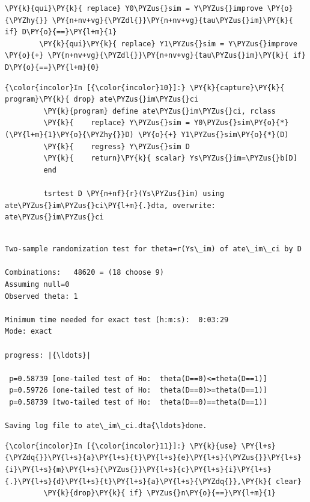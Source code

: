\documentclass[11pt,notitlepage]{article}\usepackage[]{graphicx}\usepackage[]{color}
\makeatletter
\newenvironment{kframe}{%
 \def\at@end@of@kframe{}%
 \ifinner\ifhmode%
  \def\at@end@of@kframe{\end{minipage}}%
  \begin{minipage}{\columnwidth}%
 \fi\fi%
 \def\FrameCommand##1{\hskip\@totalleftmargin \hskip-\fboxsep
 \colorbox{shadecolor}{##1}\hskip-\fboxsep
     \hskip-\linewidth \hskip-\@totalleftmargin \hskip\columnwidth}%
 \MakeFramed {\advance\hsize-\width
   \@totalleftmargin\z@ \linewidth\hsize
   \@setminipage}}%
 {\par\unskip\endMakeFramed%
 \at@end@of@kframe}
\newenvironment{knitrout}{}{} %
\makeatother
\begin{document}
\begin{enumerate}[a)]
\begin{knitrout}
\begin{kframe}
\begin{Verbatim}[commandchars=\\\{\}]
        \PY{k}{qui}\PY{k}{ replace} Y0\PYZus{}sim = Y\PYZus{}improve \PY{o}{\PYZhy{}} \PY{n+nv+vg}{\PYZdl{}}\PY{n+nv+vg}{tau\PYZus{}im}\PY{k}{ if} D\PY{o}{==}\PY{l+m}{1}
        \PY{k}{qui}\PY{k}{ replace} Y1\PYZus{}sim = Y\PYZus{}improve \PY{o}{+} \PY{n+nv+vg}{\PYZdl{}}\PY{n+nv+vg}{tau\PYZus{}im}\PY{k}{ if} D\PY{o}{==}\PY{l+m}{0}
\end{Verbatim}

    \begin{Verbatim}[commandchars=\\\{\}]
{\color{incolor}In [{\color{incolor}10}]:} \PY{k}{capture}\PY{k}{ program}\PY{k}{ drop} ate\PYZus{}im\PYZus{}ci
         \PY{k}{program} define ate\PYZus{}im\PYZus{}ci, rclass
         \PY{k}{	replace} Y\PYZus{}sim = Y0\PYZus{}sim\PY{o}{*}(\PY{l+m}{1}\PY{o}{\PYZhy{}}D) \PY{o}{+} Y1\PYZus{}sim\PY{o}{*}(D) 
         \PY{k}{	regress} Y\PYZus{}sim D 
         \PY{k}{    return}\PY{k}{ scalar} Ys\PYZus{}im=\PYZus{}b[D]	
         end
         
         tsrtest D \PY{n+nf}{r}(Ys\PYZus{}im) using ate\PYZus{}im\PYZus{}ci\PY{l+m}{.}dta, overwrite: ate\PYZus{}im\PYZus{}ci
\end{Verbatim}

    \begin{Verbatim}[commandchars=\\\{\}]

Two-sample randomization test for theta=r(Ys\_im) of ate\_im\_ci by D

Combinations:   48620 = (18 choose 9)
Assuming null=0
Observed theta: 1

Minimum time needed for exact test (h:m:s):  0:03:29
Mode: exact

progress: |{\ldots}|

 p=0.58739 [one-tailed test of Ho:  theta(D==0)<=theta(D==1)]
 p=0.59726 [one-tailed test of Ho:  theta(D==0)>=theta(D==1)]
 p=0.58739 [two-tailed test of Ho:  theta(D==0)==theta(D==1)]

Saving log file to ate\_im\_ci.dta{\ldots}done.

    \end{Verbatim}

    \begin{Verbatim}[commandchars=\\\{\}]
{\color{incolor}In [{\color{incolor}11}]:} \PY{k}{use} \PY{l+s}{\PYZdq{}}\PY{l+s}{a}\PY{l+s}{t}\PY{l+s}{e}\PY{l+s}{\PYZus{}}\PY{l+s}{i}\PY{l+s}{m}\PY{l+s}{\PYZus{}}\PY{l+s}{c}\PY{l+s}{i}\PY{l+s}{.}\PY{l+s}{d}\PY{l+s}{t}\PY{l+s}{a}\PY{l+s}{\PYZdq{}},\PY{k}{ clear}
         \PY{k}{drop}\PY{k}{ if} \PYZus{}n\PY{o}{==}\PY{l+m}{1}
         

\end{Verbatim}
\end{kframe}
\end{knitrout}
\end{enumerate}
\end{document}
